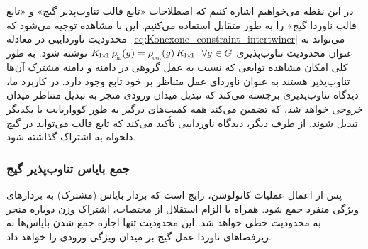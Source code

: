 در این نقطه می‌خواهیم اشاره کنیم که اصطلاحات «تابع قالب تناوب‌پذیر گیج» و «تابع قالب ناوردا گیج» را به طور متقابل استفاده می‌کنیم.
این با مشاهده توجیه می‌شود که محدودیت ناورداییی در معادله~\eqref{eq:Konexone_constraint_intertwiner} می‌تواند به عنوان محدودیت تناوب‌پذیری
$K_{\!1\!\times\!1}\, \rhoin(g) = \rhoout(g)\, K_{\!1\!\times\!1}\ \ \forall g\in G$
نوشته شود.
به طور کلی امکان مشاهده توابعی که نسبت به عمل گروهی در دامنه و دامنه مشترک آن‌ها تناوب‌پذیر هستند به عنوان ناوردای عمل متناظر بر خود تابع وجود دارد.
در کاربرد ما، دیدگاه تناوب‌پذیری برجسته می‌کند که تبدیل میدان ورودی منجر به تبدیل متناظر میدان خروجی خواهد شد، که تضمین می‌کند همه کمیت‌های درگیر به طور کوواریانت با یکدیگر تبدیل شوند.
از طرف دیگر، دیدگاه ناورداییی تأکید می‌کند که تابع قالب می‌تواند در گیج دلخواه به اشتراک گذاشته شود.










\subsubsection{جمع بایاس تناوب‌پذیر گیج}
\label{sec:gauge_bias_summation}

پس از اعمال عملیات کانولوشن، رایج است که بردار بایاس (مشترک) به بردارهای ویژگی منفرد جمع شود.
همراه با الزام استقلال از مختصات، اشتراک وزن دوباره منجر به محدودیت خطی خواهد شد.
این محدودیت تنها اجازه جمع شدن بایاس‌ها به زیرفضاهای ناوردا عمل گیج بر میدان ویژگی ورودی را خواهد داد.


